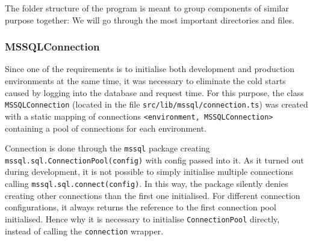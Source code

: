 The folder structure of the program is meant to group components of similar purpose together:
We will go through the most important directories and files.



\subsubsection{MSSQLConnection}
Since one of the requirements is to initialise both development and production environments at the same time, it was necessary to eliminate the cold starts caused by logging into the database and request time. 
For this purpose, the class \texttt{MSSQLConnection} (located in the file \texttt{src/lib/mssql/connection.ts}) was created with a static mapping of connections \texttt{<environment, MSSQLConnection>} containing a pool of connections for each environment.

Connection is done through the \texttt{mssql} package creating \\ \texttt{mssql.sql.ConnectionPool(config)} with config passed into it.
As it turned out during development, it is not possible to simply initialise multiple connections calling \texttt{mssql.sql.connect(config)}.
In this way, the package silently denies creating other connections than the first one initialised.
For different connection configurations, it always returns the reference to the first connection pool initialised.
Hence why it is necessary to initialise \texttt{ConnectionPool} directly, instead of calling the \texttt{connection} wrapper.

